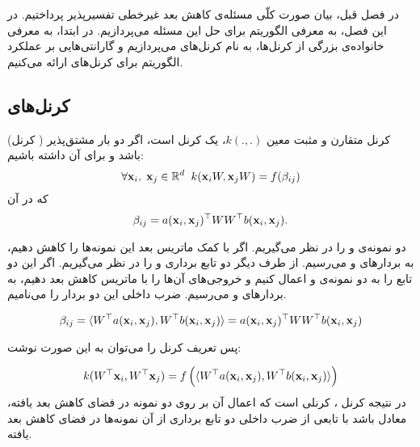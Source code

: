 
\chapter[الگوریتم 
\lr{ISM}
]{
}

در فصل قبل، بیان صورت کلّی مسئله‌ی کاهش بعد غیرخطی تفسیر‌پذیر پرداختیم. در این فصل، به معرفی الگوریتم
برای حل این مسئله می‌پردازیم. در ابتدا، به معرفی خانواده‌ی بزرگی از کرنل‌ها، به نام کرنل‌های
می‌پردازیم و گارانتی‌هایی بر عملکرد الگوریتم
برای کرنل‌های 
ارائه می‌کنیم.

\section{کرنل‌های 
}

\begin{den}
	\label{ISM-def}
	(کرنل‌
	)
کرنل متقارن و مثبت معین
$k(., .)$،
یک کرنل 
است، اگر دو بار مشتق‌پذیر باشد و برای آن داشته باشیم:
\begin{equation}
\forall \mathbf{x}_i, \; \mathbf{x}_j \in \mathbb{R}^d \;\;
k(\mathbf{x}_iW, \mathbf{x}_jW) = f(\beta_{ij})
\end{equation}
که در آن
\begin{equation}
\beta_{ij} = a(\mathbf{x}_i, \mathbf{x}_j)^\top WW^\top b(\mathbf{x}_i, \mathbf{x}_j).
\end{equation}

\end{den}

دو نمونه‌ی
و
را در نظر می‌گیریم. اگر با کمک ماتریس
بعد این نمونه‌ها را کاهش دهیم، به بردارهای
و
می‌رسیم. از طرف دیگر دو تابع برداری
و
را در نظر می‌گیریم. اگر این دو تابع را به دو نمونه‌ی 
و
اعمال کنیم و خروجی‌های آن‌ها را با ماتریس
کاهش بعد دهیم، به بردارهای
و
می‌رسیم. ضرب داخلی این دو بردار را
می‌نامیم.

\[\beta_{ij} = \langle W^\top a(\mathbf{x}_i, \mathbf{x}_j), W^\top b(\mathbf{x}_i, \mathbf{x}_j)\rangle = a(\mathbf{x}_i, \mathbf{x}_j)^\top WW^\top b(\mathbf{x}_i, \mathbf{x}_j)\]

پس تعریف کرنل
را می‌توان به این صورت نوشت:

\[k(W^\top\mathbf{x}_i, W^\top\mathbf{x}_j) = f\left(\langle W^\top a(\mathbf{x}_i, \mathbf{x}_j), W^\top b(\mathbf{x}_i, \mathbf{x}_j)\rangle\right)\]
در نتیجه کرنل 
،
کرنلی است که اعمال آن بر روی دو نمونه‌ در فضای کاهش بعد یافته، معادل باشد با تابعی از ضرب داخلی دو تابع برداری از آن نمونه‌ها در فضای کاهش بعد یافته.


